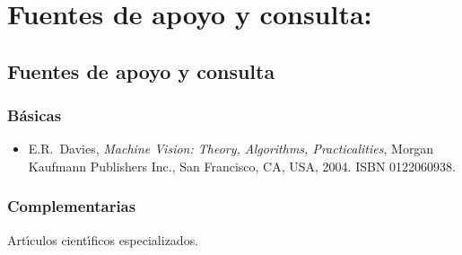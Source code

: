 \documentclass[10 pt]{article}
\begin{document}
\section{Fuentes de apoyo y consulta:}
\subsection{Fuentes de apoyo y consulta}
\subsubsection{B\'{a}sicas}

 \begin{itemize}[itemsep=0em]

 \item{E.R.\ {\sc Davies}, {\em Machine Vision: Theory, Algorithms,
       Practicalities}, Morgan Kaufmann Publishers Inc., San
     Francisco, CA, USA, 2004. ISBN 0122060938.}
   
\end{itemize}

\subsubsection{Complementarias}

Art\'{\i}culos cient\'{\i}ficos especializados.

\label{final} %


\end{document}
